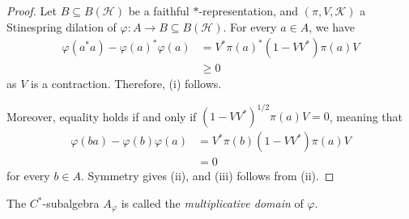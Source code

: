 \documentclass[10pt]{mypackage}
\begin{document}
\begin{proof}
  Let $B\subseteq B\left( \mathcal{H} \right)$ be a faithful $\ast$-representation, and $\left( \pi,V,\mathcal{K} \right)$ a Stinespring dilation of $\varphi\colon A\rightarrow B\subseteq B\left( \mathcal{H} \right)$. For every $a\in A$, we have
  \begin{align*}
    \varphi\left( a^{\ast}a \right) - \varphi\left( a \right)^{\ast}\varphi\left( a \right) &= V^{\ast}\pi\left( a \right)^{\ast}\left( 1-VV^{\ast} \right)\pi\left( a \right)V\\
                                                                                            &\geq 0
  \end{align*}
  as $V$ is a contraction. Therefore, (i) follows.

  Moreover, equality holds if and only if $\left( 1-VV^{\ast} \right)^{1/2}\pi(a)V = 0$, meaning that
  \begin{align*}
    \varphi\left( ba \right) - \varphi\left( b \right)\varphi\left( a \right) &= V^{\ast}\pi(b)\left( 1-VV^{\ast} \right)\pi(a)V\\
                                                                              &= 0
  \end{align*}
  for every $b\in A$. Symmetry gives (ii), and (iii) follows from (ii).
\end{proof}
The $C^{\ast}$-subalgebra $A_{\varphi}$ is called the \textit{multiplicative domain} of $\varphi$. 
\end{document}
